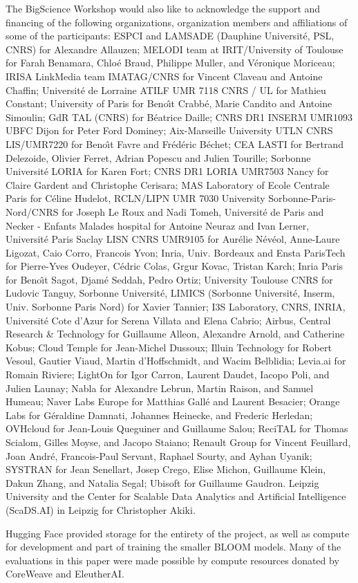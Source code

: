 \documentclass[twoside,11pt]{article}
\begin{document}
\begin{acks}
The BigScience Workshop would also like to acknowledge the support and financing of the following organizations, organization members and affiliations of some of the participants: ESPCI and LAMSADE (Dauphine Universit\'e, PSL, CNRS) for Alexandre Allauzen; MELODI team at IRIT/University of Toulouse for Farah Benamara, Chlo\'e Braud, Philippe Muller, and V\'eronique Moriceau; IRISA LinkMedia team IMATAG/CNRS for Vincent Claveau and Antoine Chaffin; Universit\'e de Lorraine ATILF UMR 7118 CNRS / UL for Mathieu Constant; University of Paris for Beno\^\i t Crabb\'e, Marie Candito and Antoine Simoulin; GdR TAL (CNRS) for B\'eatrice Daille; CNRS DR1 INSERM UMR1093 UBFC Dijon for Peter Ford Dominey; Aix-Marseille University UTLN CNRS LIS/UMR7220 for Beno\^\i t Favre and Fr\'ed\'eric B\'echet; CEA LASTI for Bertrand Delezoide, Olivier Ferret, Adrian Popescu and Julien Tourille; Sorbonne Universit\'e LORIA for Karen Fort; CNRS DR1 LORIA UMR7503 Nancy for Claire Gardent and Christophe Cerisara; MAS Laboratory of Ecole Centrale Paris for C\'eline Hudelot, RCLN/LIPN UMR 7030 University Sorbonne-Paris-Nord/CNRS for Joseph Le Roux and Nadi Tomeh, Universit\'e de Paris and Necker - Enfants Malades hospital for Antoine Neuraz and Ivan Lerner, Universit\'e Paris Saclay LISN CNRS UMR9105 for Aur\'elie N\'ev\'eol, Anne-Laure Ligozat, Caio Corro, Francois Yvon; Inria, Univ. Bordeaux and Ensta ParisTech for Pierre-Yves Oudeyer, C\'edric Colas, Grgur Kovac, Tristan Karch; Inria Paris for Beno\^\i t Sagot, Djam\'e Seddah, Pedro Ortiz; University Toulouse CNRS for Ludovic Tanguy, Sorbonne Universit\'e, LIMICS (Sorbonne Universit\'e, Inserm, Univ. Sorbonne Paris Nord) for Xavier Tannier; I3S Laboratory, CNRS, INRIA, Universit\'e Cote d’Azur for Serena Villata and Elena Cabrio; Airbus, Central Research \& Technology for Guillaume Alleon, Alexandre Arnold, and Catherine Kobus; Cloud Temple for Jean-Michel Dussoux; Illuin Technology for Robert Vesoul, Gautier Viaud, Martin d’Hoffschmidt, and Wacim Belblidia; Levia.ai for 
Romain Riviere; LightOn for Igor Carron, Laurent Daudet, Iacopo Poli, and Julien Launay; Nabla for Alexandre Lebrun, Martin Raison, and Samuel Humeau; Naver Labs Europe for Matthias Gall\'e and Laurent Besacier; Orange Labs for G\'eraldine Damnati, Johannes Heinecke, and Frederic Herledan; OVHcloud for Jean-Louis Queguiner and Guillaume Salou; ReciTAL for Thomas Scialom, Gilles Moyse, and Jacopo Staiano; Renault Group for Vincent Feuillard, Joan Andr\'e, Francois-Paul Servant, Raphael Sourty, and Ayhan Uyanik; SYSTRAN for Jean Senellart, Josep Crego, Elise Michon, Guillaume Klein, Dakun Zhang, and Natalia Segal; Ubisoft for Guillaume Gaudron. Leipzig University and the Center for Scalable Data Analytics and Artificial Intelligence (ScaDS.AI) in Leipzig for Christopher Akiki.

Hugging Face provided storage for the entirety of the project, as well as compute for development and part of training the smaller BLOOM models. Many of the evaluations in this paper were made possible by compute resources donated by CoreWeave and EleutherAI.
\end{acks}
\end{document}
